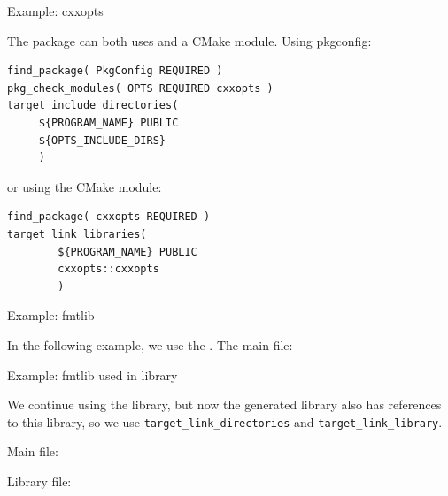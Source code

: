  {Example: cxxopts}


The  package can both uses 
and a CMake module. Using pkgconfig:
%
\begin{lstlisting}
find_package( PkgConfig REQUIRED )
pkg_check_modules( OPTS REQUIRED cxxopts )
target_include_directories(
     ${PROGRAM_NAME} PUBLIC
     ${OPTS_INCLUDE_DIRS}
     )
\end{lstlisting}
%
or using the CMake module:
%
\begin{lstlisting}
find_package( cxxopts REQUIRED )
target_link_libraries(
        ${PROGRAM_NAME} PUBLIC
        cxxopts::cxxopts
        )
\end{lstlisting}


 {Example: fmtlib}
\label{sec:cmake-fmtlib}


In the following example, we use the .
The main  file:
%


 {Example: fmtlib used in library}


We continue using the  library,
but now the generated library also has references to this library,
so we use \lstinline+target_link_directories+ and \lstinline+target_link_library+.

Main file:
%


Library file:
%



